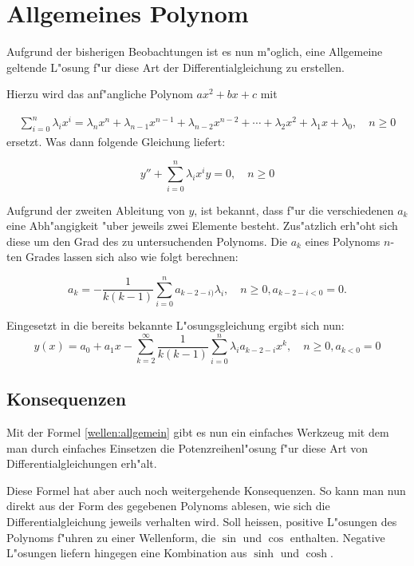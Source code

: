 \section{Allgemeines Polynom}
Aufgrund der bisherigen Beobachtungen ist es nun m"oglich, eine 
Allgemeine geltende L"osung f"ur diese Art der Differentialgleichung zu 
erstellen.

Hierzu wird das anf"angliche Polynom $ax^2 + bx + c$ mit

\begin{equation*}
\begin{split}
	\sum_{i=0}^{n}\lambda_ix^i =
	\lambda_nx^n + \lambda_{n-1}x^{n-1} + \lambda_{n-2}x^{n-2} + \dotsb + 
	\lambda_2x^2 + \lambda_1x + \lambda_0, \quad n \ge 0
\end{split}
\end{equation*}
ersetzt. Was dann folgende Gleichung liefert:

\begin{equation*}
	y''+\sum_{i=0}^{n}\lambda_ix^i y=0, \quad n \ge 0
\end{equation*}

Aufgrund der zweiten Ableitung von $y$, ist bekannt, dass f"ur die 
verschiedenen $a_k$ eine Abh"angigkeit "uber jeweils zwei Elemente besteht. 
Zus"atzlich erh"oht sich diese um den Grad des zu untersuchenden Polynoms. 
Die $a_k$ eines Polynoms $n$-ten Grades lassen sich also wie folgt berechnen:

\begin{equation*}
	a_k = -\frac{1}{k(k-1)}\sum_{i=0}^{n}a_{k-2-i)}\lambda_i, \quad n \ge 0, 
	a_{k-2-i < 0} =  0.
\end{equation*}

Eingesetzt in die bereits bekannte L"osungsgleichung ergibt sich nun:
\begin{equation}
	y(x) = a_0 + a_1x - \sum_{k=2}^{\infty}\frac{1}{k(k-1)}\sum_{i=0}^{n}
	\lambda_ia_{k-2-i}x^k, \quad n \ge 0, a_{k < 0} = 0
	\label{wellen:allgemein}
\end{equation}

\subsection{Konsequenzen}

Mit der Formel \ref{wellen:allgemein} gibt es nun ein einfaches Werkzeug mit 
dem man durch einfaches Einsetzen die Potenzreihenl"osung f"ur diese Art von 
Differentialgleichungen erh"alt.

Diese Formel hat aber auch noch weitergehende Konsequenzen. So kann man nun 
direkt aus der Form des gegebenen Polynoms ablesen, wie sich die 
Differentialgleichung jeweils verhalten wird. Soll heissen, positive L"osungen 
des Polynoms f"uhren zu einer Wellenform, die $\sin$ und $\cos$ enthalten. 
Negative L"osungen liefern hingegen eine Kombination aus $\sinh$ und $\cosh$.


